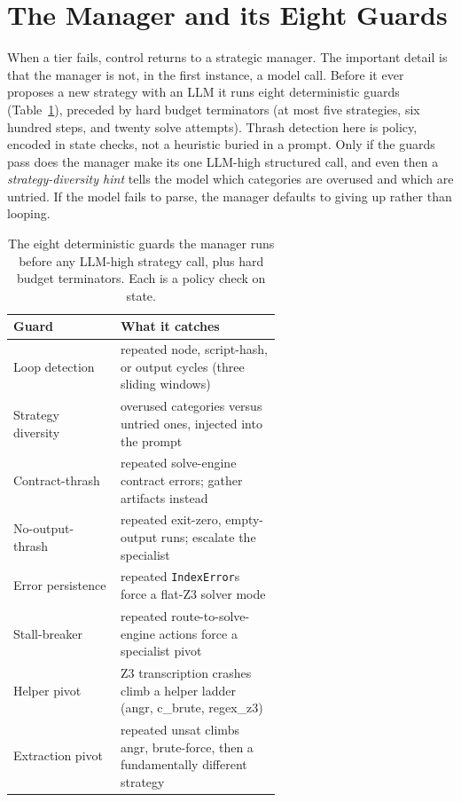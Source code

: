 \documentclass[10pt,twocolumn]{article}
\begin{document}
\section{The Manager and its Eight Guards}
\label{sec:manager}

When a tier fails, control returns to a strategic manager. The important detail is that the manager is not,
in the first instance, a model call. Before it ever proposes a new strategy with an LLM it runs eight
deterministic guards (Table~\ref{tab:guards}), preceded by hard budget terminators (at most five
strategies, six hundred steps, and twenty solve attempts). Thrash detection here is policy, encoded in
state checks, not a heuristic buried in a prompt. Only if the guards pass does the manager make its one
LLM-high structured call, and even then a \emph{strategy-diversity hint} tells the model which categories
are overused and which are untried. If the model fails to parse, the manager defaults to giving up rather
than looping.

\begin{table}[t]
  \centering\small
  \setlength{\tabcolsep}{5pt}\renewcommand{\arraystretch}{1.18}
  \begin{tabular}{@{}l p{0.60\linewidth}@{}}
    \toprule
    \textbf{Guard} & \textbf{What it catches} \\
    \midrule
    Loop detection    & repeated node, script-hash, or output cycles (three sliding windows) \\
    Strategy diversity & overused categories versus untried ones, injected into the prompt \\
    Contract-thrash   & repeated solve-engine contract errors; gather artifacts instead \\
    No-output-thrash  & repeated exit-zero, empty-output runs; escalate the specialist \\
    Error persistence & repeated \texttt{IndexError}s force a flat-Z3 solver mode \\
    Stall-breaker     & repeated route-to-solve-engine actions force a specialist pivot \\
    Helper pivot      & Z3 transcription crashes climb a helper ladder (angr, c\_brute, regex\_z3) \\
    Extraction pivot  & repeated unsat climbs angr, brute-force, then a fundamentally different strategy \\
    \bottomrule
  \end{tabular}
  \caption{The eight deterministic guards the manager runs before any LLM-high strategy call, plus hard
  budget terminators. Each is a policy check on state.}
  \label{tab:guards}
\end{table}
\end{document}
